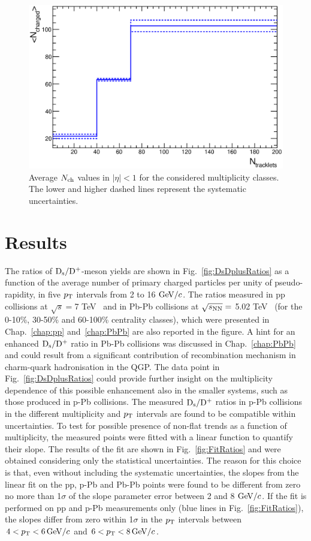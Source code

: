 \begin{figure}[h]
\centering
 \includegraphics[width=.55\textwidth]{FigCap6/AverNchAndTotalSystUnc.eps}
 \caption{Average $N_{\rm ch}$ values in $|\eta|<1$ for the considered multiplicity classes. The lower and higher dashed lines represent the systematic uncertainties.}
 \label{fig:Nch}
\end{figure}

\section{Results}
\label{sec:results}
The ratios of ${\rm D_s}/{\rm D^+}$-meson yields are shown in Fig.~\ref{fig:DsDplusRatios} as a function of
the average number of primary charged particles per unity of pseudo-rapidity, 
in five $p_{\rm T}$ intervals from 2 to 16 $\mathrm{GeV}/c$.
The ratios measured in pp collisions at $\sqrt{s}=$7 TeV~\cite{Acharya:2017jgo} and 
in Pb-Pb collisions at $\sqrt{s_{\rm NN}}=$ 5.02 TeV~\cite{ALICE-PUBLIC-2017-003}
(for the 0-10\%, 30-50\% and 60-100\% centrality classes), which were presented in Chap.~\ref{chap:pp} and~\ref{chap:PbPb} 
are also reported in the figure.
A hint for an enhanced ${\rm D_s}/{\rm D^+}$ ratio in Pb-Pb collisions was discussed in Chap.~\ref{chap:PbPb} and could result
from a significant contribution of recombination mechanism in charm-quark hadronisation in the QGP.
The data point in Fig.~\ref{fig:DsDplusRatios} could provide further insight on the multiplicity 
dependence of this possible enhancement also in the smaller systems, such as those produced
in p-Pb collisions. The measured ${\rm D_s}/{\rm D^+}$ ratios in p-Pb collisions in the different 
multiplicity and $p_{\rm T}$ intervals are found to be compatible within uncertainties. 
To test for possible presence of non-flat trends as a function of multiplicity, the measured points were 
fitted with a linear function to quantify their slope. The results of the fit are shown in Fig.~\ref{fig:FitRatios}
and were obtained considering only the statistical uncertainties. The reason for this choice is that, even without including the
systematic uncertainties, the slopes from the linear fit on the pp, 
p-Pb and Pb-Pb points were found to be different from zero no more than 
1$\sigma$ of the slope parameter error between 2 and 8 $\mathrm{GeV}/c$. 
If the fit is performed on pp and p-Pb measurements only (blue lines in Fig.~\ref{fig:FitRatios}), 
the slopes differ from zero within 1$\sigma$ 
in the $p_{\rm T}$ intervals between $4<p_{\rm T}<6 \, \mathrm{GeV}/c$ and $6<p_{\rm T}<8 \,\mathrm{GeV}/c$. 
 
